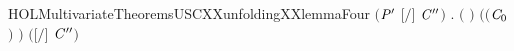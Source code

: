 \begin{SaveVerbatim}{HOLMultivariateTheoremsUSCXXunfoldingXXlemmaFour}
               \ensuremath{(}\ensuremath{\HOLBoundVar{P}\sp{\prime}} \HOLSymConst{\ensuremath{=}} \ensuremath{[}\ensuremath{/}\ensuremath{]} \ensuremath{\HOLBoundVar{C}\sp{\prime\prime}}\ensuremath{)} \HOLSymConst{\HOLTokenConj{}}
               \HOLSymConst{\HOLTokenForall{}}.
                   \ensuremath{(}  \HOLSymConst{\ensuremath{=}}  \ensuremath{)} \HOLSymConst{\HOLTokenImp{}}
                    \ensuremath{(}\ensuremath{(}\ensuremath{\HOLBoundVar{C}\sb{\mathrm{0}}} \HOLConst{\HOLTokenCompose}   \ensuremath{)} \ensuremath{)}  \ensuremath{(}\ensuremath{[}\ensuremath{/}\ensuremath{]} \ensuremath{\HOLBoundVar{C}\sp{\prime\prime}}\ensuremath{)}
\end{SaveVerbatim}
\newcommand{\HOLMultivariateTheoremsUSCXXunfoldingXXlemmaFour}{\UseVerbatim{HOLMultivariateTheoremsUSCXXunfoldingXXlemmaFour}}
